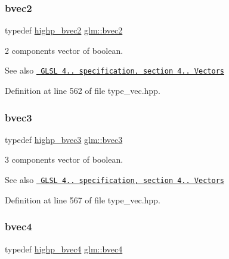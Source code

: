 \subsubsection{\texorpdfstring{bvec2}{bvec2}}
{\footnotesize\ttfamily typedef \mbox{\hyperlink{group__core__precision_gaf76ced5823e8aace6bd257fac6c250cb}{highp\+\_\+bvec2}} \mbox{\hyperlink{group__core__types_ga7523cf292181cf7daef3aa0a3267d8e3}{glm\+::bvec2}}}

2 components vector of boolean.

\begin{DoxySeeAlso}{See also}
\href{http://www.opengl.org/registry/doc/GLSLangSpec.4.20.8.pdf}{\texttt{ G\+L\+SL 4.. specification, section 4.. Vectors}} 
\end{DoxySeeAlso}


Definition at line 562 of file type\+\_\+vec.\+hpp.

\mbox{\label{group__core__types_ga3f07d6d37fc6fe875170fd5799685bcf}} 
\subsubsection{\texorpdfstring{bvec3}{bvec3}}
{\footnotesize\ttfamily typedef \mbox{\hyperlink{group__core__precision_gac35c0ff5b9eead09e905b4aa09d1e954}{highp\+\_\+bvec3}} \mbox{\hyperlink{group__core__types_ga3f07d6d37fc6fe875170fd5799685bcf}{glm\+::bvec3}}}

3 components vector of boolean.

\begin{DoxySeeAlso}{See also}
\href{http://www.opengl.org/registry/doc/GLSLangSpec.4.20.8.pdf}{\texttt{ G\+L\+SL 4.. specification, section 4.. Vectors}} 
\end{DoxySeeAlso}


Definition at line 567 of file type\+\_\+vec.\+hpp.

\mbox{\label{group__core__types_ga6bb211b3d3bebae3867548d5673ca5cd}} 
\subsubsection{\texorpdfstring{bvec4}{bvec4}}
{\footnotesize\ttfamily typedef \mbox{\hyperlink{group__core__precision_ga12155cf93fb8fea5d9c4c7e2d72aed4e}{highp\+\_\+bvec4}} \mbox{\hyperlink{group__core__types_ga6bb211b3d3bebae3867548d5673ca5cd}{glm\+::bvec4}}}

